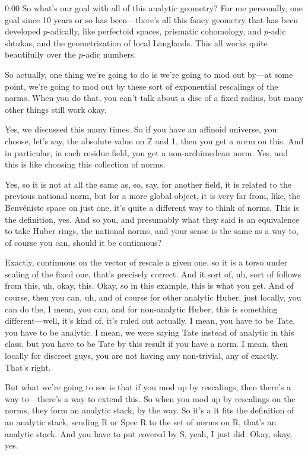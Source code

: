 \begin{unfinished}{0:00}
So what's our goal with all of this analytic geometry? For me personally, one goal since 10 years or so has been---there's all this fancy geometry that has been developed $p$-adically, like perfectoid spaces, prismatic cohomology, and $p$-adic shtukas, and the geometrization of local Langlands. This all works quite beautifully over the $p$-adic numbers.


So actually, one thing we're going to do is we're going to mod out by---at some point, we're going to mod out by these sort of exponential rescalings of the norms. When you do that, you can't talk about a disc of a fixed radius, but many other things still work okay. 

Yes, we discussed this many times. So if you have an affinoid universe, you choose, let's say, the absolute value on $\mathbb{Z}$ and 1, then you get a norm on this. And in particular, in each residue field, you get a non-archimedean norm. Yes, and this is like choosing this collection of norms.

Yes, so it is not at all the same as, so, say, for another field, it is related to the previous national norm, but for a more global object, it is very far from, like, the Benvéniste space on just one, it's quite a different way to think of norms. This is the definition, yes. And so you, and presumably what they said is an equivalence to take Huber rings, the national norms, and your sense is the same as a way to, of course you can, should it be continuous? 

Exactly, continuous on the vector of rescale a given one, so it is a torso under scaling of the fixed one, that's precisely correct. And it sort of, uh, sort of follows from this, uh, okay, this. Okay, so in this example, this is what you get. And of course, then you can, uh, and of course for other analytic Huber, just locally, you can do the, I mean, you can, and for non-analytic Huber, this is something different---well, it's kind of, it's ruled out actually. I mean, you have to be Tate, you have to be analytic. I mean, we were saying Tate instead of analytic in this class, but you have to be Tate by this result if you have a norm. I mean, then locally for discreet guys, you are not having any non-trivial, any of exactly. That's right.

But what we're going to see is that if you mod up by rescalings, then there's a way to---there's a way to extend this. So when you mod up by rescalings on the norms, they form an analytic stack, by the way. So it's a it fits the definition of an analytic stack, sending R or Spec R to the set of norms on R, that's an analytic stack. And you have to put covered by S, yeah, I just did. Okay, okay, yes.


\end{unfinished}
